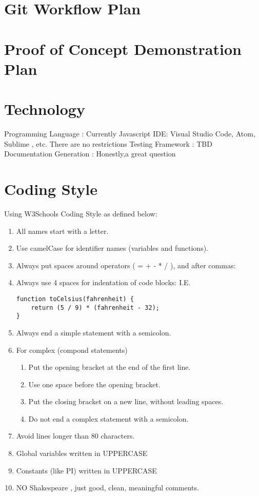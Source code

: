\documentclass{article}
\begin{document}
\section{Git Workflow Plan}
\section{Proof of Concept Demonstration Plan}
\section{Technology}

Programming Language : Currently Javascript \newline
IDE:  Visual Studio Code, Atom, Sublime , etc. There are no restrictions\newline 
Testing Framework : TBD\newline
Documentation Generation : Honestly,a great question\newline 

\section{Coding Style}

Using W3Schools Coding Style as defined below:
\begin{enumerate}
\item All names start with a letter.
\item Use camelCase for identifier names (variables and functions).
\item Always put spaces around operators ( = + - * / ), and after commas:
\item Always use 4 spaces for indentation of code blocks: I.E.
\begin{lstlisting} 
function toCelsius(fahrenheit) {
    return (5 / 9) * (fahrenheit - 32);
}
\end{lstlisting}
\item Always end a simple statement with a semicolon.
\item For complex (compond statements)
\begin{enumerate}
\item Put the opening bracket at the end of the first line.
\item  Use one space before the opening bracket.
\item  Put the closing bracket on a new line, without leading spaces.
\item  Do not end a complex statement with a semicolon.
\end{enumerate}
\item Avoid lines longer than 80 characters.
\item Global variables written in UPPERCASE 
\item Constants (like PI) written in UPPERCASE
\item NO Shakespeare , just good, clean, meaningful comments.
\end{enumerate}
\end{document}
